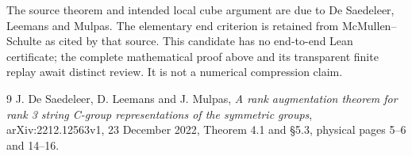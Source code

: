 \documentclass[a4paper,11pt]{article}
\begin{document}
The source theorem and intended local cube argument are due to
De Saedeleer, Leemans and Mulpas. The elementary end criterion is retained
from McMullen--Schulte as cited by that source. This candidate has no
end-to-end Lean certificate; the complete mathematical proof above and
its transparent finite replay await distinct review. It is not a numerical
compression claim.

\begin{thebibliography}{9}
 J. De Saedeleer, D. Leemans and J. Mulpas,
\emph{A rank augmentation theorem for rank 3 string C-group representations
of the symmetric groups}, arXiv:2212.12563v1, 23 December 2022,
Theorem 4.1 and \S5.3, physical pages 5--6 and 14--16.
\end{thebibliography}
\end{document}
